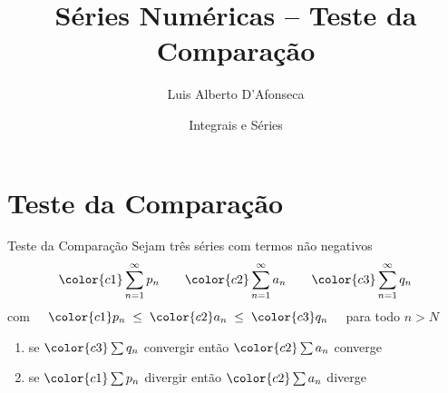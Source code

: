 
\usepackage{apresentacao}
\usepackage{mathconfig}
\usepackage{tabto}

\makeatletter
\graphicspath  {{./figs/}}
\makeatother

\setcounter{exemplo}{0}

\title {Séries Numéricas -- Teste da Comparação}
\author{\large Luis Alberto D'Afonseca}
\date  {Integrais e Séries}



\begin{frame}
  \titlepage
\end{frame}

\section{Teste da Comparação}

\begin{frame}{Teste da Comparação}
  Sejam três séries com termos não negativos
  \[
    {\color{c1} \sum_{n=1}^{\infty} p_n} \qquad
    {\color{c2} \sum_{n=1}^{\infty} a_n} \qquad
    {\color{c3} \sum_{n=1}^{\infty} q_n}
  \]
  com \( \quad {\color{c1}p_n} \;\leq\; {\color{c2}a_n} \;\leq\; {\color{c3}q_n} \quad \) para todo $n>N$

  \pause
  \hspace{\baselineskip}
  \begin{enumerate}
    \item se \tabto{8mm} \(\color{c3} \sum q_n \) convergir \tabto{40mm} então  \(\color{c2} \sum a_n \) converge \\[6mm]\pause
    \item se \tabto{8mm} \(\color{c1} \sum p_n \) divergir  \tabto{40mm} então  \(\color{c2} \sum a_n \) diverge
  \end{enumerate}
\end{frame}

